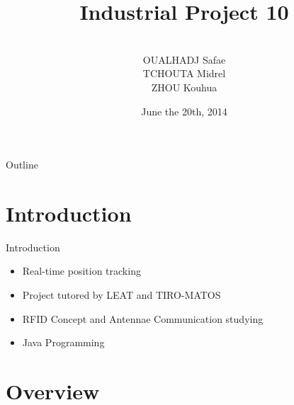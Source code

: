 \documentclass[utf8,compress]{beamer}
\title{Industrial Project 10}
\subtitle{\slidesubject}
\author{{}\\
OUALHADJ Safae     \\
TCHOUTA Midrel     \\
ZHOU Kouhua
}
\date{June the 20th, 2014}
\institute{
    Polytech Nice Sophia\\
    --\\
    LEAT \\
    --\\
    TIRO-MATOs\\
}
\begin{document}
\begin{frame}
\titlepage
\end{frame}



\begin{frame}{Outline}
\tableofcontents
\end{frame}
 

\section{Introduction}

\begin{frame}{Introduction}
\begin{itemize}
   \item Real-time position tracking
\vspace{1em} 
    \item Project tutored by LEAT and TIRO-MATOS
    \vspace{1em} 
    \item RFID Concept and Antennae Communication studying  
\vspace{1em} 
    \item Java Programming 

\end{itemize}

\end{frame}


\section{Overview}
\end{document}
